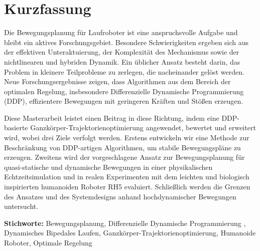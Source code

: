 \thispagestyle{empty}
\chapter*{Kurzfassung}

Die Bewegungsplanung f{\"u}r Laufroboter ist eine anspruchsvolle Aufgabe und bleibt ein aktives Forschungsgebiet. Besondere Schwierigkeiten ergeben sich aus der effektiven Unteraktuierung, der Komplexit{\"a}t des Mechanismus sowie der nichtlinearen und hybriden Dynamik. Ein {\"u}blicher Ansatz besteht darin, das Problem in kleinere Teilprobleme zu zerlegen, die nacheinander gel{\"o}st werden. Neue Forschungsergebnisse zeigen, dass Algorithmen aus dem Bereich der optimalen Regelung, insbesondere Differenzielle Dynamische Programmierung (DDP), effizientere Bewegungen mit geringeren Kr{\"a}ften und St{\"o}{\ss}en erzeugen.

Diese Masterarbeit leistet einen Beitrag in diese Richtung, indem eine DDP-basierte Ganzk{\"o}rper-Trajektorienoptimierung angewendet, bewertet und erweitert wird, wobei drei Ziele verfolgt werden. Erstens entwickeln wir eine Methode zur Beschr{\"a}nkung von DDP-artigen Algorithmen, um stabile Bewegungspl{\"a}ne zu erzeugen. Zweitens wird der vorgeschlagene Ansatz zur Bewegungsplanung f{\"u}r quasi-statische und dynamische Bewegungen in einer physikalischen Echtzeitsimulation und in realen Experimenten mit dem leichten und biologisch inspirierten humanoiden Roboter RH5 evaluiert. Schlie{\ss}lich werden die Grenzen des Ansatzes und des Systemdesigns anhand hochdynamischer Bewegungen untersucht.

\vfill
\noindent\textbf{Stichworte:} Bewegungsplanung, Differenzielle Dynamische Programmierung , Dynamisches Bipedales Laufen, Ganzk{\"o}rper-Trajektorienoptimierung, Humanoide Roboter, Optimale Regelung
